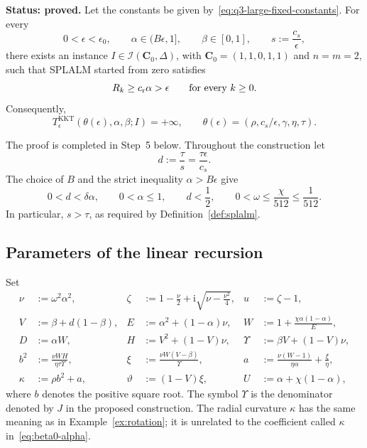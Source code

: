 \begin{theorem}[Large primal-center stepsizes at \(s=c_s/\epsilon\)]
\label{thm:q3-large-alpha}
\textbf{Status: proved.}
Let the constants be given by~\eqref{eq:q3-large-fixed-constants}.
For every
\[
0<\epsilon<\epsilon_0,\qquad
\alpha\in(B\epsilon,1],\qquad \beta\in[0,1],\qquad
s:=\frac{c_s}{\epsilon},
\]
there exists an instance
\(I\in\mathcal I(\mathbf C_0,\Delta)\), with
\(\mathbf C_0=(1,1,0,1,1)\) and \(n=m=2\), such that SPLALM
started from zero satisfies
\[
R_k\ge c_{\rm r}\alpha>\epsilon
\qquad\text{for every }k\ge0.
\]
Consequently,
\[
T^{\mathrm{KKT}}_\epsilon(\theta(\epsilon),\alpha,\beta;I)
=+\infty,
\qquad
\theta(\epsilon)=(\rho,c_s/\epsilon,\gamma,\eta,\tau).
\]
\end{theorem}

The proof is completed in Step~5 below. Throughout the construction let
\[
d:=\frac{\tau}{s}=\frac{\tau\epsilon}{c_s}.
\]
The choice of \(B\) and the strict inequality \(\alpha>B\epsilon\)
give
\begin{equation}
0<d<\delta\alpha,\qquad 0<\alpha\le1,
\qquad d<\frac12,
\qquad 0<\omega\le\frac{\chi}{512}\le\frac1{512}.
\label{eq:q3-large-domain}
\end{equation}
In particular, \(s>\tau\), as required by Definition~\ref{def:splalm}.

\subsection{Parameters of the linear recursion}
\label{subsec:q3-large-parameters}

Set
\begin{equation}
\begin{aligned}
\nu&:=\omega^2\alpha^2,
&\zeta&:=1-\frac{\nu}{2}
       +\mathrm{i}\sqrt{\nu-\frac{\nu^2}{4}},
&u&:=\zeta-1,\\
V&:=\beta+d(1-\beta),
&E&:=\alpha^2+(1-\alpha)\nu,
&W&:=1+\frac{\chi\alpha(1-\alpha)}{E},\\
D&:=\alpha W,
&H&:=V^2+(1-V)\nu,
&\Upsilon&:=\beta V+(1-V)\nu,\\
b^2&:=\frac{\nu WH}{\eta\tau\Upsilon},
&\xi&:=\frac{\nu W(V-\beta)}{\Upsilon},
&a&:=\frac{\nu(W-1)}{\eta\alpha}+\frac{\xi}{\eta},\\
\kappa&:=\rho b^2+a,
&\vartheta&:=(1-V)\xi,
&U&:=\alpha+\chi(1-\alpha),
\end{aligned}
\label{eq:q3-large-parameters}
\end{equation}
where \(b\) denotes the positive square root. The symbol
\(\Upsilon\) is the denominator denoted by \(J\) in the proposed
construction. The radial curvature \(\kappa\) has the same meaning
as in Example~\ref{ex:rotation}; it is unrelated to the coefficient
called \(\kappa\) in~\eqref{eq:beta0-alpha}.

